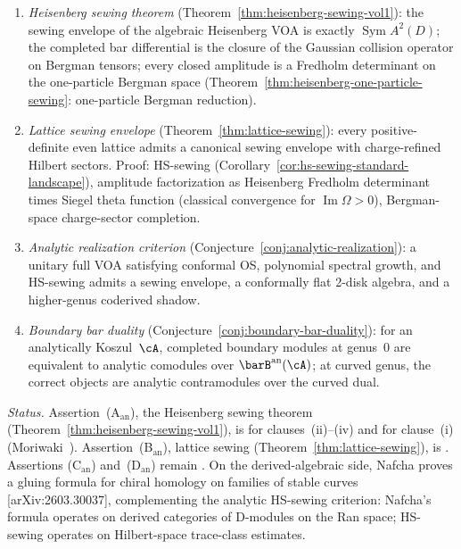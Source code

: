 \begin{enumerate}[label=\textup{(\Alph*$_{\mathrm{an}}$)}]
\item \emph{Heisenberg sewing theorem}
 (Theorem~\ref{thm:heisenberg-sewing-vol1}): the sewing envelope
 of the algebraic Heisenberg VOA is exactly
 $\operatorname{Sym} A^2(D)$; the completed bar differential is
 the closure of the Gaussian collision operator on Bergman tensors;
 every closed amplitude is a Fredholm determinant on the
 one-particle Bergman space
 (Theorem~\ref{thm:heisenberg-one-particle-sewing}: one-particle
 Bergman reduction).
\item \emph{Lattice sewing envelope}
 (Theorem~\ref{thm:lattice-sewing}):
 every positive-definite even lattice admits a canonical sewing envelope
 with charge-refined Hilbert sectors. Proof: HS-sewing
 (Corollary~\ref{cor:hs-sewing-standard-landscape}),
 amplitude factorization as Heisenberg Fredholm determinant times
 Siegel theta function (classical convergence for
 $\operatorname{Im}\Omega > 0$), Bergman-space charge-sector completion.
\item \emph{Analytic realization criterion}
 (Conjecture~\ref{conj:analytic-realization}): a unitary full VOA
 satisfying conformal OS, polynomial spectral growth, and
 HS-sewing admits a sewing envelope, a conformally flat 2-disk
 algebra, and a higher-genus coderived shadow.
\item \emph{Boundary bar duality}
 (Conjecture~\ref{conj:boundary-bar-duality}): for an
 analytically Koszul~$\cA$, completed boundary modules at
 genus~$0$ are equivalent to analytic comodules over
 $\barB^{\mathrm{an}}(\cA)$; at curved genus, the correct
 objects are analytic contramodules over the curved dual.
\end{enumerate}

\noindent
\emph{Status.} Assertion~(A$_{\mathrm{an}}$), the Heisenberg sewing
theorem (Theorem~\ref{thm:heisenberg-sewing-vol1}), is \ClaimStatusProvedHere{}
for clauses~(ii)--(iv) and \ClaimStatusProvedElsewhere{} for
clause~(i) (Moriwaki~\cite{Moriwaki26b}). Assertion~(B$_{\mathrm{an}}$), lattice sewing
(Theorem~\ref{thm:lattice-sewing}), is \ClaimStatusProvedHere{}.
Assertions (C$_{\mathrm{an}}$) and~(D$_{\mathrm{an}}$) remain
\ClaimStatusConjectured{}.
On the derived-algebraic side, Nafcha proves a gluing formula for
chiral homology on families of stable curves [arXiv:2603.30037],
complementing the analytic HS-sewing criterion: Nafcha's formula
operates on derived categories of D-modules on the Ran space;
HS-sewing operates on Hilbert-space trace-class estimates.

